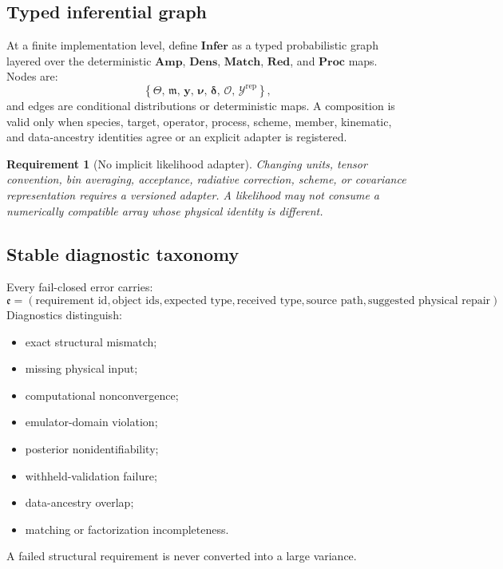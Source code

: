 \documentclass[11pt]{article}
\newtheorem{requirement}[definition]{Requirement}
\newcommand{\Amp}{\mathbf{Amp}}
\newcommand{\Dens}{\mathbf{Dens}}
\newcommand{\Match}{\mathbf{Match}}
\newcommand{\Red}{\mathbf{Red}}
\newcommand{\Proc}{\mathbf{Proc}}
\newcommand{\Infer}{\mathbf{Infer}}
\newcommand{\cO}{\mathcal O}
\newcommand{\cY}{\mathcal Y}
\newcommand{\repdata}{\mathrm{rep}}
\begin{document}
\subsection{Typed inferential graph}

At a finite implementation level, define \(\Infer\) as a typed probabilistic
graph layered over the deterministic \(\Amp\), \(\Dens\), \(\Match\),
\(\Red\), and \(\Proc\) maps.  Nodes are:
\begin{equation}
 \left\{
 \Theta,\,
 \mathfrak m,\,
 \bm y,\,
 \bm\nu,\,
 \bm\delta,\,
 \cO,\,
 \cY^{\repdata}
 \right\},
 \label{eq:infer-nodes}
\end{equation}
and edges are conditional distributions or deterministic maps.  A composition
is valid only when species, target, operator, process, scheme, member,
kinematic, and data-ancestry identities agree or an explicit adapter is
registered.

\begin{requirement}[No implicit likelihood adapter]
Changing units, tensor convention, bin averaging, acceptance, radiative
correction, scheme, or covariance representation requires a versioned adapter.
A likelihood may not consume a numerically compatible array whose physical
identity is different.
\end{requirement}

\subsection{Stable diagnostic taxonomy}

Every fail-closed error carries:
\begin{equation}
 \mathfrak e
 =
 \left(
 \text{requirement id},
 \text{object ids},
 \text{expected type},
 \text{received type},
 \text{source path},
 \text{suggested physical repair}
 \right).
 \label{eq:diagnostic-schema}
\end{equation}
Diagnostics distinguish:
\begin{itemize}
\item exact structural mismatch;
\item missing physical input;
\item computational nonconvergence;
\item emulator-domain violation;
\item posterior nonidentifiability;
\item withheld-validation failure;
\item data-ancestry overlap;
\item matching or factorization incompleteness.
\end{itemize}
A failed structural requirement is never converted into a large variance.
\end{document}
